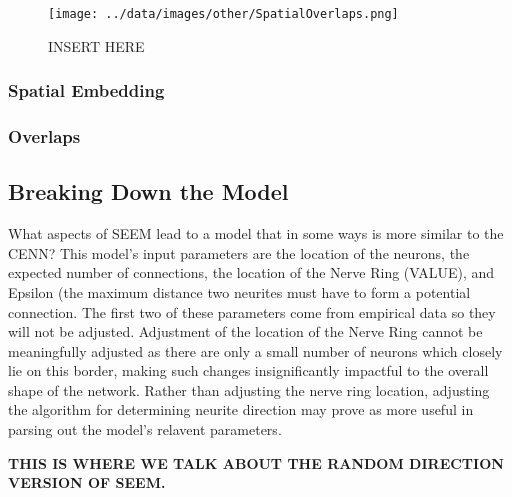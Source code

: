 
\begin{figure*}[h]
  \texttt{[image: ../data/images/other/SpatialOverlaps.png]}
  \caption{INSERT HERE}
\end{figure*}

\subsubsection{Spatial Embedding}
\subsubsection{Overlaps}

\subsection{Breaking Down the Model}
What aspects of SEEM lead to a model that in some ways is more similar to the CENN? This model's input parameters are the location of the neurons, the expected number of connections, the location of the Nerve Ring (VALUE), and Epsilon (the maximum distance two neurites must have to form a potential connection. The first two of these parameters come from empirical data so they will not be adjusted. Adjustment of the location of the Nerve Ring cannot be meaningfully adjusted as there are only a small number of neurons which closely lie on this border, making such changes insignificantly impactful to the overall shape of the network. Rather than adjusting the nerve ring location, adjusting the algorithm for determining neurite direction may prove as more useful in parsing out the model's relavent parameters. 

\textbf{THIS IS WHERE WE TALK ABOUT THE RANDOM DIRECTION VERSION OF SEEM.}



